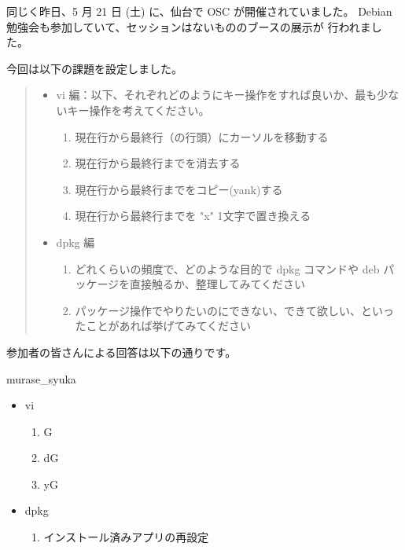\documentclass[mingoth,a4paper]{jsarticle}
\begin{document}
同じく昨日、5 月 21 日 (土) に、仙台で OSC が開催されていました。
Debian 勉強会も参加していて、セッションはないもののブースの展示が
行われました。

\clearpage

今回は以下の課題を設定しました。

\begin{quote}
  \begin{screen}
    \begin{itemize}
    \item vi 編：以下、それぞれどのようにキー操作をすれば良いか、最も少ないキー操作を考えてください。
      \begin{enumerate}
        \item 現在行から最終行（の行頭）にカーソルを移動する
        \item 現在行から最終行までを消去する
        \item 現在行から最終行までをコピー(yank)する
        \item 現在行から最終行までを "x" 1文字で置き換える
      \end{enumerate}
    \item dpkg 編
      \begin{enumerate}
        \item どれくらいの頻度で、どのような目的で dpkg コマンドや deb パッケージを直接触るか、整理してみてください
        \item パッケージ操作でやりたいのにできない、できて欲しい、といったことがあれば挙げてみてください
      \end{enumerate}
    \end{itemize}
  \end{screen}
\end{quote}

参加者の皆さんによる回答は以下の通りです。

\begin{prework}{ murase\_syuka }
  \begin{itemize}
  \item vi
    \begin{enumerate}
    \item G
    \item dG
    \item yG
    \end{enumerate}
  \item dpkg
    \begin{enumerate}
    \item インストール済みアプリの再設定
    \end{enumerate}
  \end{itemize}
\end{prework}
\end{document}
